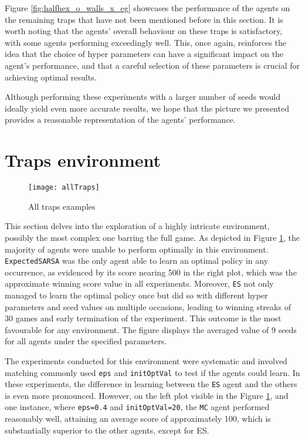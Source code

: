 Figure \ref{fig:halfhex_o_walls_x_eg} showcases the performance of the agents on the remaining traps that have not been mentioned before in this section. It is worth noting that the agents' overall behaviour on these traps is satisfactory, with some agents performing exceedingly well. This, once again, reinforces the idea that the choice of hyper parameters can have a significant impact on the agent's performance, and that a careful selection of these parameters is crucial for achieving optimal results.

Although performing these experiments with a larger number of seeds would ideally yield even more accurate results, we hope that the picture we presented provides a reasonable representation of the agents' performance.

\section{Traps environment}
\begin{figure}[h]
    \centering
    \texttt{[image: allTraps]}
    \caption{All traps examples}
    \label{fig:alltraps_eg}
\end{figure}

This section delves into the exploration of a highly intricate environment, possibly the most complex one barring the full game. As depicted in Figure \ref{fig:alltraps_eg}, the majority of agents were unable to perform optimally in this environment. \texttt{ExpectedSARSA} was the only agent able to learn an optimal policy in any occurrence, as evidenced by its score nearing 500 in the right plot, which was the approximate winning score value in all experiments. Moreover, \texttt{ES} not only managed to learn the optimal policy once but did so with different hyper parameters and seed values on multiple occasions, leading to winning streaks of 30 games and early termination of the experiment. This outcome is the most favourable for any environment. The figure displays the averaged value of 9 seeds for all agents under the specified parameters. 

The experiments conducted for this environment were systematic and involved matching commonly used \texttt{eps} and \texttt{initOptVal} to test if the agents could learn. In these experiments, the difference in learning between the \texttt{ES} agent and the others is even more pronounced. However, on the left plot visible in the Figure \ref{fig:alltraps_eg}, and one instance, where \texttt{eps=0.4} and \texttt{initOptVal=20}, the \texttt{MC} agent performed reasonably well, attaining an average score of approximately 100, which is substantially superior to the other agents, except for ES.

